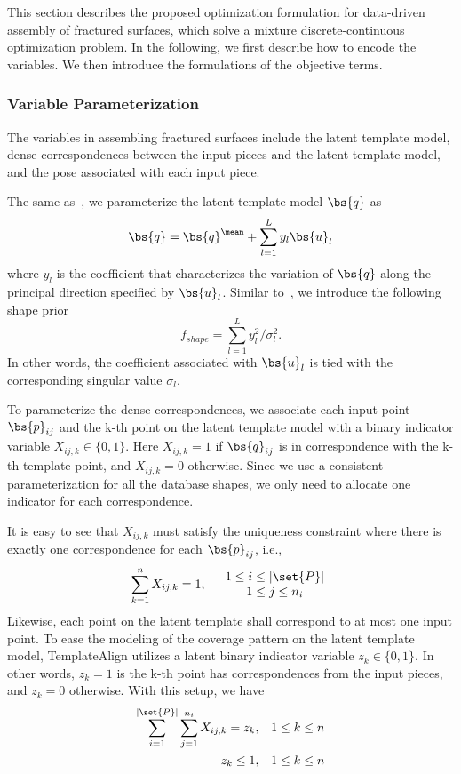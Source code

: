 This section describes the proposed optimization formulation for data-driven assembly of fractured surfaces, which solve a mixture discrete-continuous optimization problem. In the following, we first describe how to encode the variables. We then introduce the formulations of the objective terms.

\subsubsection{Variable Parameterization} The variables in assembling fractured surfaces include the latent template model, dense correspondences between the input pieces and the latent template model, and the pose associated with each input piece. 

The same as~\cite{Blanz:1999:MMS}, we parameterize the latent template model $\bs{q}$ as
\begin{equation}
\bs{q} = \bs{q}^{\mean} + \sum\limits_{l=1}^{L} y_l \bs{u}_l    
\end{equation}
where $y_l$ is the coefficient that characterizes the variation of $\bs{q}$ along the principal direction specified by $\bs{u}_l$. Similar to~\cite{Blanz:1999:MMS}, we introduce the following shape prior
\begin{equation}
f_{shape} = \sum\limits_{l=1}^{L} y_l^2/\sigma_l^2.
\label{Eq:Shape:Prior}    
\end{equation}
In other words, the coefficient associated with $\bs{u}_l$ is tied with the corresponding singular value $\sigma_l$.

To parameterize the dense correspondences, we associate each input point $\bs{p}_{ij}$ and the k-th point on the latent template model with a binary indicator variable $X_{ij,k}\in \{0,1\}$. Here $X_{ij,k} = 1$ if $\bs{q}_{ij}$ is in correspondence with the k-th template point, and $X_{ij,k} = 0$ otherwise. Since we use a consistent parameterization for all the database shapes, we only need to allocate one indicator for each correspondence. 

It is easy to see that $X_{ij,k}$ must satisfy the uniqueness constraint where there is exactly one correspondence for each $\bs{p}_{ij}$, i.e.,
\begin{equation}
\sum\limits_{k=1}^{n} X_{ij,k} = 1, \quad
\begin{array}{c}
1 \leq i \leq |\set{P}| \\
1 \leq j \leq n_i
\end{array}
\label{Eq:Unique:Cons:1}
\end{equation}
Likewise, each point on the latent template shall correspond to at most one input point. To ease the modeling of the coverage pattern on the latent template model, TemplateAlign utilizes a latent binary indicator variable $z_k \in \{0,1\}$. In other words, $z_k =1$ is the k-th point has correspondences from the input pieces, and $z_k = 0$ otherwise. With this setup, we have
\begin{align}
\sum\limits_{i=1}^{|\set{P}|}\sum\limits_{j=1}^{n_i} X_{ij,k} = z_k, & \quad 1\leq k \leq n \label{Eq:Unique:Cons:2}\\
z_k\leq 1, & \quad 1\leq k \leq n \label{Eq:Unique:Cons:3}
\end{align}

